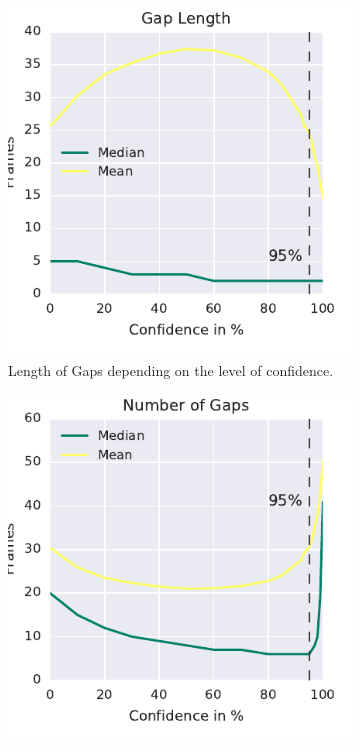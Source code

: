 \begin{figure}
	\centering
	\begin{subfigure}[b]{0.45\textwidth}
		\includegraphics[width=\textwidth]{Figures/gaplen}
		\caption[Length of Gaps]{Length of Gaps depending on the level of confidence.}
		\label{fig:gaplen}
	\end{subfigure}
	\begin{subfigure}[b]{0.45\textwidth}
		\includegraphics[width=\textwidth]{Figures/numgaps}

\end{subfigure}
\end{figure}
